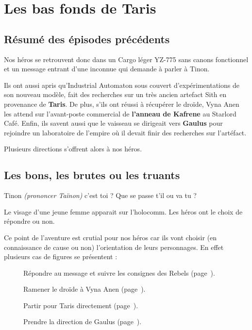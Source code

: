 \section{Les bas fonds de Taris}

\subsection{Résumé des épisodes précédents}
Nos héros se retrouvent donc dans un Cargo léger YZ-775 sans canons fonctionnel et un message entrant d’une inconnue qui demande à parler à Tinon.

Ils ont aussi apris qu’Industrial Automaton sous couvert d’expérimentations de son nouveau modèle, fait des recherches sur un très ancien artefact Sith en provenance de \textbf{Taris}. De plus, s’ils ont réussi à récupérer le droïde, Vyna Anen les attend sur l’avant-poste commercial de \textbf{l’anneau de Kafrene} au Starlord Café. Enfin, ils savent aussi que le vaisseau se dirigeait vers \textbf{Gaulus} pour rejoindre un laboratoire de l’empire où il devait finir des recherches sur l’artéfact.

Plusieurs directions s’offrent alors à nos héros.

\subsection{Les bons, les brutes ou les truants}
\begin{quotebox}
    Tinon \emph{(prononcer Taïnon)} c’est toi ? Que se passe t’il ou va tu ?
\end{quotebox}
Le visage d’une jeune femme apparait sur l’holocomm. Les héros ont le choix de répondre ou non.

Ce point de l’aventure est crutial pour nos héros car ils vont choisir (en connaissance de cause ou non) l’orientation de leurs personnages. En effet plusieurs cas de figures se présentent :

\begin{description}
    \item[] Répondre au message et suivre les consignes des Rebels (page~\pageref{sec:les-rebels}).
    \item[] Ramener le droïde à Vyna Anen (page~\pageref{sec:retour-du-droide}).
    \item[] Partir pour Taris directement (page~\pageref{sec:refus-d-obtemperer}).
    \item[] Prendre la direction de Gaulus (page~\pageref{sec:l-empire}).
\end{description}

